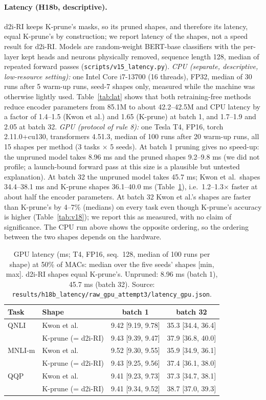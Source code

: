 \documentclass[11pt]{article}
\begin{document}
\paragraph{Latency (H18b, descriptive).} d2i-RI keeps K-prune's masks, so its pruned shapes, and therefore its latency, equal K-prune's by construction; we report latency of the shapes, not a speed result for d2i-RI. Models are random-weight BERT-base
classifiers with the per-layer kept heads and neurons physically removed, sequence length 128, median of repeated forward passes (\texttt{scripts/v15\_latency.py}).
\emph{CPU (separate, descriptive, low-resource setting):} one Intel Core i7-13700 (16 threads), FP32, median of 30 runs after 5 warm-up runs, seed-7 shapes only, measured while the machine was otherwise lightly used.
Table~\ref{tab:lat} shows that both retraining-free methods reduce encoder parameters from 85.1M to about 42.2--42.5M and CPU latency by a factor of 1.4--1.5 (Kwon et al.) and 1.65 (K-prune) at batch 1, and 1.7--1.9 and 2.05 at batch 32.
\emph{GPU (protocol of rule 8):} one Tesla T4, FP16, torch 2.11.0+cu130, transformers 4.51.3, median of 100 runs after 20 warm-up runs, all 15 shapes per method (3 tasks $\times$ 5 seeds).
At batch 1 pruning gives no speed-up: the unpruned model takes 8.96 ms and the pruned shapes 9.2--9.8 ms (we did not profile; a launch-bound forward pass at this size is a plausible but untested explanation).
At batch 32 the unpruned model takes 45.7 ms; Kwon et al.\ shapes 34.4--38.1 ms and K-prune shapes 36.1--40.0 ms (Table~\ref{tab:latgpu}), i.e.\ 1.2--1.3$\times$ faster at about half the encoder parameters.
At batch 32 Kwon et al.'s shapes are faster than K-prune's by 4--7\% (medians) on every task even though K-prune's accuracy is higher (Table~\ref{tab:v18}); we report this as measured, with no claim of significance. The CPU run above shows the opposite ordering,
so the ordering between the two shapes depends on the hardware.
\begin{table}[t]\centering\small
\caption{GPU latency (ms; T4, FP16, seq.\ 128, median of 100 runs per shape) at 50\% of MACs: median over the five seeds' shapes [min, max]. d2i-RI shapes equal K-prune's. Unpruned: 8.96 ms (batch 1), 45.7 ms (batch 32). Source:
\texttt{results/h18b\_latency/raw\_gpu\_attempt3/latency\_gpu.json}.}\label{tab:latgpu}
\begin{tabular}{llcc}\toprule
Task & Shape & batch 1 & batch 32\\\midrule
QNLI & Kwon et al. & 9.42 [9.19, 9.78] & 35.3 [34.4, 36.4]\\
 & K-prune (= d2i-RI) & 9.43 [9.39, 9.47] & 37.9 [36.8, 40.0]\\
MNLI-m & Kwon et al. & 9.52 [9.30, 9.55] & 35.9 [34.9, 36.1]\\
 & K-prune (= d2i-RI) & 9.43 [9.25, 9.56] & 37.4 [36.1, 38.0]\\
QQP & Kwon et al. & 9.41 [9.23, 9.73] & 37.3 [34.7, 38.1]\\
 & K-prune (= d2i-RI) & 9.41 [9.34, 9.52] & 38.7 [37.0, 39.3]\\\bottomrule
\end{tabular}\end{table}
\end{document}
